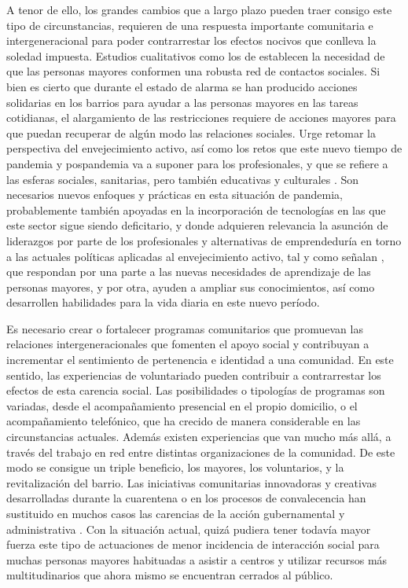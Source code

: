 \documentclass[spanish]{textolivre}
\begin{document}
A tenor de ello, los grandes cambios que a largo plazo pueden traer consigo este tipo de circunstancias, requieren de una respuesta importante comunitaria e intergeneracional para poder contrarrestar los efectos nocivos que conlleva la soledad impuesta. Estudios cualitativos como los de \textcite{rodriguez2019} %
establecen la necesidad de que las personas mayores conformen una robusta red de contactos sociales. Si bien es cierto que durante el estado de alarma se han producido acciones solidarias en los barrios para ayudar a las personas mayores en las tareas cotidianas, el alargamiento de las restricciones requiere de acciones mayores para que puedan recuperar de algún modo las relaciones sociales. Urge retomar la perspectiva del envejecimiento activo, así como los retos que este nuevo tiempo de pandemia y pospandemia va a suponer para los profesionales, y que se refiere a las esferas sociales, sanitarias, pero también educativas y culturales \cite{cuesta2020}. %
Son necesarios nuevos enfoques y prácticas en esta situación de pandemia, probablemente también apoyadas en la incorporación de tecnologías en las que este sector sigue siendo deficitario, y donde adquieren relevancia la asunción de liderazgos por parte de los profesionales y alternativas de emprendeduría en torno a las actuales políticas aplicadas al envejecimiento activo, tal y como señalan \textcite{hinojolucena2018}, %
que respondan  por una parte a las nuevas necesidades de aprendizaje de las personas mayores, y por otra, ayuden a ampliar sus conocimientos, así como desarrollen habilidades  para la vida diaria en este nuevo período.

Es necesario crear o fortalecer programas comunitarios que promuevan las relaciones intergeneracionales que fomenten el apoyo social y contribuyan a incrementar el sentimiento de pertenencia e identidad a una comunidad. En este sentido, las experiencias de voluntariado pueden contribuir a contrarrestar los efectos de esta carencia social. Las posibilidades o tipologías de programas son variadas, desde el acompañamiento presencial en el propio domicilio, o el acompañamiento telefónico, que ha crecido de manera considerable en las circunstancias actuales. Además existen experiencias que van mucho más allá, a través del trabajo en red entre distintas organizaciones de la comunidad. De este modo se consigue un triple beneficio, los mayores, los voluntarios, y la revitalización del barrio. Las iniciativas comunitarias innovadoras y creativas desarrolladas durante la cuarentena o en los procesos de convalecencia han sustituido en muchos casos las carencias de la acción gubernamental y administrativa \cite{gonzalez2020}. %
Con la situación actual, quizá pudiera tener todavía mayor fuerza este tipo de actuaciones de menor incidencia de interacción social para muchas personas mayores habituadas a asistir a centros y utilizar recursos más multitudinarios que ahora mismo se encuentran cerrados al público.
\end{document}
